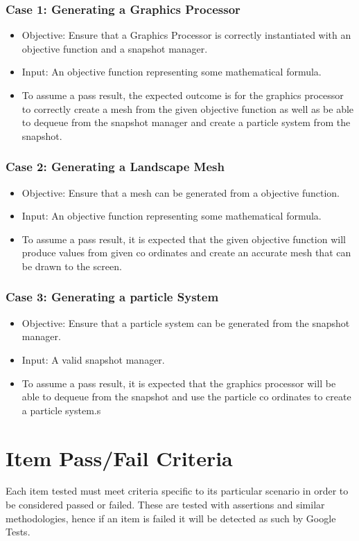 \documentclass[11pt]{article}
\begin{document}
\subsubsection{Case 1: Generating a Graphics Processor}
\begin{itemize}
	\item Objective: Ensure that a Graphics Processor is correctly instantiated with an objective function and a snapshot manager.
	\item Input: An objective function representing some mathematical formula.
	\item To assume a pass result, the expected outcome is for the graphics processor to correctly create a mesh from the given objective function as well as be able to dequeue from the snapshot manager and create a particle system from the snapshot.
\end{itemize}

\subsubsection{Case 2: Generating a Landscape Mesh}
\begin{itemize}
	\item Objective: Ensure that a mesh can be generated from a objective function.
	\item Input: An objective function representing some mathematical formula.
	\item To assume a pass result, it is expected that the given objective function will produce values from given co ordinates and create an accurate mesh that can be drawn to the screen.
\end{itemize}

\subsubsection{Case 3: Generating a particle System}
\begin{itemize}
	\item Objective: Ensure that a particle system can be generated from the snapshot manager.
	\item Input: A valid snapshot manager.
	\item To assume a pass result, it is expected that the graphics processor will be able to dequeue from the snapshot and use the particle co ordinates to create a particle system.s
\end{itemize}

\section{Item Pass/Fail Criteria}
Each item tested must meet criteria specific to its particular scenario in order to be considered passed or failed. These are tested with assertions and similar methodologies, hence if an item is failed it will be detected as such by Google Tests.
\end{document}
